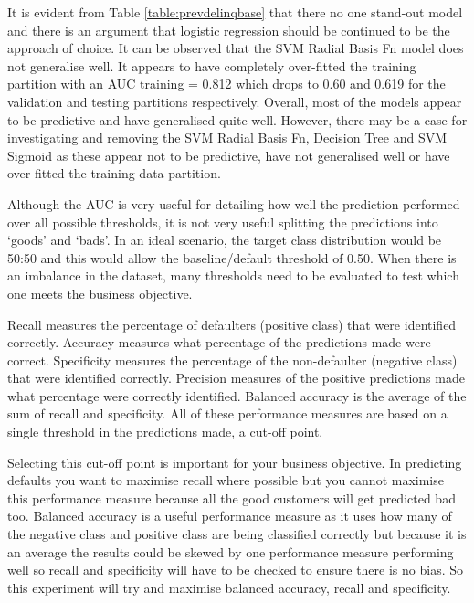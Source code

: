 It is evident from Table \ref{table:prevdelinqbase} that there no one stand-out model and there is an argument that logistic regression should be continued to be the approach of choice. It can be observed that the SVM Radial Basis Fn model does not generalise well. It appears to have completely over-fitted the training partition with an AUC training = 0.812 which drops to 0.60 and 0.619 for the validation and testing partitions respectively. Overall, most of the models appear to be predictive and have generalised quite well. However, there may be a case for investigating and removing the SVM Radial Basis Fn, Decision Tree and SVM Sigmoid as these appear not to be predictive, have not generalised well or have over-fitted the training data partition.  

Although the AUC is very useful for detailing how well the prediction performed over all possible thresholds, it is not very useful splitting the predictions into `goods' and `bads'. In an ideal scenario, the target class distribution would be 50:50 and this would allow the baseline/default threshold of 0.50. When there is an imbalance in the dataset, many thresholds need to be evaluated to test which one meets the business objective.

Recall measures the percentage of defaulters (positive class) that were identified correctly. Accuracy measures what percentage of the predictions made were correct. Specificity measures the percentage of the non-defaulter (negative class) that were identified correctly. Precision measures of the positive predictions made what percentage were correctly identified. Balanced accuracy is the average of the sum of recall and specificity. All of these performance measures are based on a single threshold in the predictions made, a cut-off point.

Selecting this cut-off point is important for your business objective. In predicting defaults you want to maximise recall where possible but you cannot maximise this performance measure because all the good customers will get predicted bad too. Balanced accuracy is a useful performance measure as it uses how many of the negative class and positive class are being classified correctly but because it is an average the results could be skewed by one performance measure performing well so recall and specificity will have to be checked to ensure there is no bias. So this experiment will try and maximise balanced accuracy, recall and specificity.

